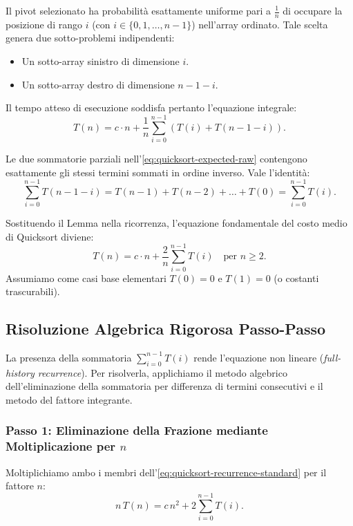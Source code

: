 Il pivot selezionato ha probabilità esattamente uniforme pari a $\frac{1}{n}$ di occupare la posizione di rango $i$ (con $i \in \{0, 1, \dots, n - 1\}$) nell'array ordinato. Tale scelta genera due sotto-problemi indipendenti:
\begin{itemize}
  \item Un sotto-array sinistro di dimensione $i$.
  \item Un sotto-array destro di dimensione $n - 1 - i$.
\end{itemize}

Il tempo atteso di esecuzione soddisfa pertanto l'equazione integrale:
\begin{equation}
  T(n) = c \cdot n + \frac{1}{n} \sum_{i=0}^{n-1} \left( T(i) + T(n - 1 - i) \right).
  \label{eq:quicksort-expected-raw}
\end{equation}

\begin{lemma}
Le due sommatorie parziali nell'\autoref{eq:quicksort-expected-raw} contengono esattamente gli stessi termini sommati in ordine inverso. Vale l'identità:
\begin{equation}
  \sum_{i=0}^{n-1} T(n - 1 - i) = T(n-1) + T(n-2) + \dots + T(0) = \sum_{i=0}^{n-1} T(i).
\end{equation}
\end{lemma}

Sostituendo il Lemma nella ricorrenza, l'equazione fondamentale del costo medio di Quicksort diviene:
\begin{equation}
  T(n) = c \cdot n + \frac{2}{n} \sum_{i=0}^{n-1} T(i) \quad \text{per } n \ge 2.
  \label{eq:quicksort-recurrence-standard}
\end{equation}
Assumiamo come casi base elementari $T(0) = 0$ e $T(1) = 0$ (o costanti trascurabili).
\FloatBarrier

\subsection{Risoluzione Algebrica Rigorosa Passo-Passo}
\label{subsec:quicksort-step-by-step-solution}

La presenza della sommatoria $\sum_{i=0}^{n-1} T(i)$ rende l'equazione non lineare (\textit{full-history recurrence}). Per risolverla, applichiamo il metodo algebrico dell'eliminazione della sommatoria per differenza di termini consecutivi e il metodo del fattore integrante.

\subsubsection{Passo 1: Eliminazione della Frazione mediante Moltiplicazione per $n$}
Moltiplichiamo ambo i membri dell'\autoref{eq:quicksort-recurrence-standard} per il fattore $n$:
\begin{equation}
  n \, T(n) = c \, n^2 + 2 \sum_{i=0}^{n-1} T(i).
  \label{eq:quicksort-step1}
\end{equation}

